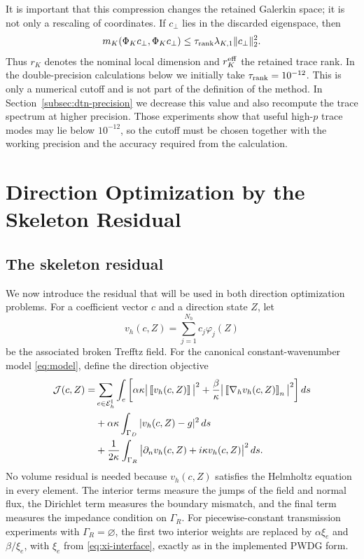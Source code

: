 \documentclass[pdflatex,sn-mathphys-num]{sn-jnl}
\theoremstyle{thmstyleone}
\theoremstyle{thmstyletwo}
\newcommand{\Ei}{\mathcal E_h^{\rm I}}
\newcommand{\jump}[1]{\left[\!\left[#1\right]\!\right]}
\newcommand{\jumpn}[1]{\left[\!\left[#1\right]\!\right]_{n}}
\begin{document}
It is important that this compression changes the retained Galerkin space; it is not only a rescaling of coordinates.  If $c_\perp$ lies in the discarded eigenspace, then
\begin{equation}\label{eq:discard-bound}
 m_K(\Phi_Kc_\perp,\Phi_Kc_\perp)
 \le \tau_{\rm rank}\lambda_{K,1}\|c_\perp\|_2^2.
\end{equation}
Thus $r_K$ denotes the nominal local dimension and $r_K^{\rm eff}$ the retained trace rank.  In the double-precision calculations below we initially take $\tau_{\rm rank}=10^{-12}$.  This is only a numerical cutoff and is not part of the definition of the method.  In Section~\ref{subsec:dtn-precision} we decrease this value and also recompute the trace spectrum at higher precision.  Those experiments show that useful high-$p$ trace modes may lie below $10^{-12}$, so the cutoff must be chosen together with the working precision and the accuracy required from the calculation.

\section{Direction Optimization by the Skeleton Residual}\label{sec:nonlinear}

\subsection{The skeleton residual}\label{subsec:exactJ}
We now introduce the residual that will be used in both direction optimization problems.  For a coefficient vector $c$ and a direction state $Z$, let
\[
 v_h(c,Z)=\sum_{j=1}^{N_h}c_j\varphi_j(Z)
\]
be the associated broken Trefftz field.  For the canonical constant-wavenumber model \eqref{eq:model}, define the direction objective
\begin{align}\label{eq:J}
 \mathcal J(c,Z)=&\sum_{e\in\Ei}\int_e
 \left[
 \alpha\kappa\big|\jump{v_h(c,Z)}\big|^2
 +\frac{\beta}{\kappa}\big|\jumpn{\nabla_hv_h(c,Z)}\big|^2
 \right]ds\\
 &+\alpha\kappa\int_{\Gamma_D}|v_h(c,Z)-g|^2\,ds\nonumber\\
 &+\frac{1}{2\kappa}\int_{\Gamma_R}
 \big|\partial_nv_h(c,Z)+i\kappa v_h(c,Z)\big|^2\,ds.\nonumber
\end{align}
No volume residual is needed because $v_h(c,Z)$ satisfies the Helmholtz equation in every element.  The interior terms measure the jumps of the field and normal flux, the Dirichlet term measures the boundary mismatch, and the final term measures the impedance condition on $\Gamma_R$.  For piecewise-constant transmission experiments with $\Gamma_R=\varnothing$, the first two interior weights are replaced by $\alpha\xi_e$ and $\beta/\xi_e$, with $\xi_e$ from \eqref{eq:xi-interface}, exactly as in the implemented PWDG form.
\end{document}
